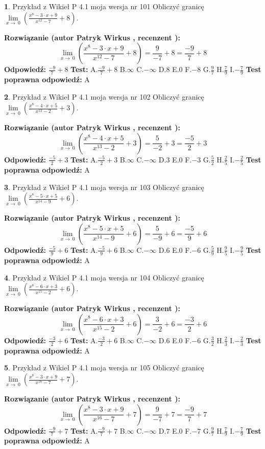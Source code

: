 \documentclass[12pt, a4paper]{article}
\theoremstyle{definition} %
\newtheorem{zad}{}
\newcommand{\zadStart}[1]{\begin{zad}#1\newline}
\newcommand{\zadStop}{\end{zad}}
\newcommand{\rozwStart}[2]{\noindent \textbf{Rozwiązanie (autor #1 , recenzent #2): }\newline}
\newcommand{\rozwStop}{\newline}
\newcommand{\odpStart}{\noindent \textbf{Odpowiedź:}\newline}
\newcommand{\odpStop}{\newline}
\newcommand{\testStart}{\noindent \textbf{Test:}\newline}
\newcommand{\testStop}{\newline}
\newcommand{\kluczStart}{\noindent \textbf{Test poprawna odpowiedź:}\newline}
\newcommand{\kluczStop}{\newline}
\begin{document}
\zadStart{Przykład z Wikieł P 4.1 moja wersja nr 101}
Obliczyć granicę $\lim\limits_{x\to\ 0}(\frac{x^{8}-3 \cdot x +9}{x^{12}-7}+8)$.
\zadStop
\rozwStart{Patryk Wirkus}{}
$$\lim\limits_{x\to\ 0}(\frac{x^{8}-3 \cdot x +9}{x^{12}-7}+8)=\frac{9}{-7}+8=\frac{-9}{7}+8$$
\rozwStop
\odpStart
$\frac{-9}{7}+8$
\odpStop
\testStart
A.$\frac{-9}{7}+8$
B.$\infty$
C.$-\infty$
D.$8$
E.$0$
F.$-8$
G.$\frac{9}{7}$
H.$\frac{7}{9}$
I.$-\frac{7}{9}$
\testStop
\kluczStart
A
\kluczStop



\zadStart{Przykład z Wikieł P 4.1 moja wersja nr 102}
Obliczyć granicę $\lim\limits_{x\to\ 0}(\frac{x^{8}-4 \cdot x +5}{x^{13}-2}+3)$.
\zadStop
\rozwStart{Patryk Wirkus}{}
$$\lim\limits_{x\to\ 0}(\frac{x^{8}-4 \cdot x +5}{x^{13}-2}+3)=\frac{5}{-2}+3=\frac{-5}{2}+3$$
\rozwStop
\odpStart
$\frac{-5}{2}+3$
\odpStop
\testStart
A.$\frac{-5}{2}+3$
B.$\infty$
C.$-\infty$
D.$3$
E.$0$
F.$-3$
G.$\frac{5}{2}$
H.$\frac{2}{5}$
I.$-\frac{2}{5}$
\testStop
\kluczStart
A
\kluczStop



\zadStart{Przykład z Wikieł P 4.1 moja wersja nr 103}
Obliczyć granicę $\lim\limits_{x\to\ 0}(\frac{x^{8}-5 \cdot x +5}{x^{14}-9}+6)$.
\zadStop
\rozwStart{Patryk Wirkus}{}
$$\lim\limits_{x\to\ 0}(\frac{x^{8}-5 \cdot x +5}{x^{14}-9}+6)=\frac{5}{-9}+6=\frac{-5}{9}+6$$
\rozwStop
\odpStart
$\frac{-5}{9}+6$
\odpStop
\testStart
A.$\frac{-5}{9}+6$
B.$\infty$
C.$-\infty$
D.$6$
E.$0$
F.$-6$
G.$\frac{5}{9}$
H.$\frac{9}{5}$
I.$-\frac{9}{5}$
\testStop
\kluczStart
A
\kluczStop



\zadStart{Przykład z Wikieł P 4.1 moja wersja nr 104}
Obliczyć granicę $\lim\limits_{x\to\ 0}(\frac{x^{8}-6 \cdot x +3}{x^{15}-2}+6)$.
\zadStop
\rozwStart{Patryk Wirkus}{}
$$\lim\limits_{x\to\ 0}(\frac{x^{8}-6 \cdot x +3}{x^{15}-2}+6)=\frac{3}{-2}+6=\frac{-3}{2}+6$$
\rozwStop
\odpStart
$\frac{-3}{2}+6$
\odpStop
\testStart
A.$\frac{-3}{2}+6$
B.$\infty$
C.$-\infty$
D.$6$
E.$0$
F.$-6$
G.$\frac{3}{2}$
H.$\frac{2}{3}$
I.$-\frac{2}{3}$
\testStop
\kluczStart
A
\kluczStop



\zadStart{Przykład z Wikieł P 4.1 moja wersja nr 105}
Obliczyć granicę $\lim\limits_{x\to\ 0}(\frac{x^{8}-3 \cdot x +9}{x^{16}-7}+7)$.
\zadStop
\rozwStart{Patryk Wirkus}{}
$$\lim\limits_{x\to\ 0}(\frac{x^{8}-3 \cdot x +9}{x^{16}-7}+7)=\frac{9}{-7}+7=\frac{-9}{7}+7$$
\rozwStop
\odpStart
$\frac{-9}{7}+7$
\odpStop
\testStart
A.$\frac{-9}{7}+7$
B.$\infty$
C.$-\infty$
D.$7$
E.$0$
F.$-7$
G.$\frac{9}{7}$
H.$\frac{7}{9}$
I.$-\frac{7}{9}$
\testStop
\kluczStart
A
\kluczStop
\end{document}
